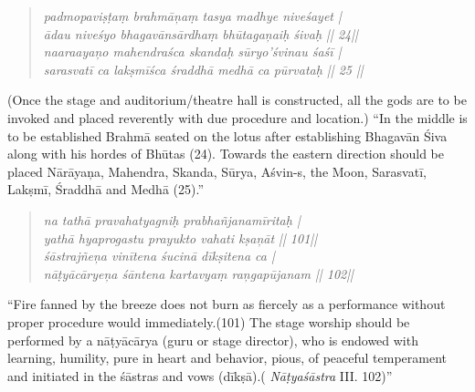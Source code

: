 \begin{verse}
\textit{padmopaviṣṭaṃ brahmāņaṃ tasya madhye niveśayet |}\\\textit{ādau niveśyo bhagavānsārdhaṃ bhūtagaņaiḥ śivaḥ || 24||}\\\textit{naaraayaņo mahendraśca skandaḥ sūryo’śvinau śaśī |}\\\textit{sarasvatī ca lakṣmīśca śraddhā medhā ca pūrvataḥ || 25 ||}
\end{verse}

(Once the stage and auditorium/theatre hall is constructed, all the gods are to be invoked and placed reverently with due procedure and location.) “In the middle is to be established Brahmā seated on the lotus after establishing Bhagavān Śiva along with his hordes of Bhūtas (24). Towards the eastern direction should be placed Nārāyaņa, Mahendra, Skanda, Sūrya, Aśvin-s, the Moon, Sarasvatī, Lakṣmī, Śraddhā and Medhā (25).”

\begin{verse}
\textit{na tathā pravahatyagniḥ prabhañjanamīritaḥ |}\\\textit{yathā hyaprogastu prayukto vahati kṣaņāt || 101||}\\\textit{śāstrajñeņa vinītena śucinā dīkṣitena ca | }\\\textit{nāṭyācāryeņa śāntena kartavyaṃ raņgapūjanam || 102||}
\end{verse}

“Fire fanned by the breeze does not burn as fiercely as a performance without proper procedure would immediately.(101) The stage worship should be performed by a nāṭyācārya (guru or stage director), who is endowed with learning, humility, pure in heart and behavior, pious, of peaceful temperament and initiated in the śāstras and vows (dīkṣā).( \textit{Nāṭyaśāstra} III. 102)” 

